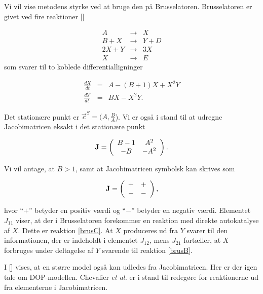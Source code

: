 \vspace{4.0mm}
Vi vil vise metodens styrke ved at bruge den p{\aa}
Brusselatoren. Brusselatoren er givet ved fire reaktioner
[]

\begin{subequations}
\begin{eqnarray}
A &\rightarrow& X \label{brusA} \\
B+X &\rightarrow& Y + D \label{brusB} \\
2X + Y &\rightarrow& 3X \label{brusC} \\
X &\rightarrow& E \label{brusD}
\end{eqnarray}
\end{subequations}
som svarer til to koblede differentialligninger

\begin{eqnarray}
\frac{dX}{dt} &=& A - (B+1)X + X^2Y \\
\frac{dY}{dt} &=& BX - X^2Y.
\end{eqnarray}

Det station{\ae}re punkt er $\vec{c}^S = (A, \frac{B}{A}$).
Vi er ogs{\aa} i stand til at udregne Jacobimatricen eksakt
i det station{\ae}re punkt

\[
  \mbox{${\bf J}$} = \left( 
  \begin{array}{cc}
  B-1 & A^2 \\
  -B  & -A^2
  \end{array}
  \right).
\]

Vi vil antage, at $B>1$, samt at Jacobimatricen symbolsk
kan skrives som

\[
\mbox{${\bf J}$} = \left(
\begin{array}{cc}
+ & + \\
- & -
\end{array} 
\right),
\]

hvor ``$+$'' betyder en positiv v{\ae}rdi og ``$-$''
betyder en negativ v{\ae}rdi. Elementet $J_{11}$ viser, at
der i Brusselatoren forekommer en reaktion med direkte
autokatalyse af $X$. Dette er reaktion \ref{brusC}. At $X$
produceres ud fra $Y$ svarer til den informationen, der er
indeholdt i elementet $J_{12}$, mens $J_{21}$
fort{\ae}ller, at $X$ forbruges under deltagelse af $Y$
svarende til reaktion \ref{brusB}.

\vspace{4.0mm}
I [] vises, at en st{\o}rre model ogs{\aa}
kan udledes fra Jacobimatricen. Her er der igen tale om
DOP-modellen. Chevalier {\em et al.} er i stand til
redeg{\o}re for reaktionerne ud fra elementerne i
Jacobimatricen.
